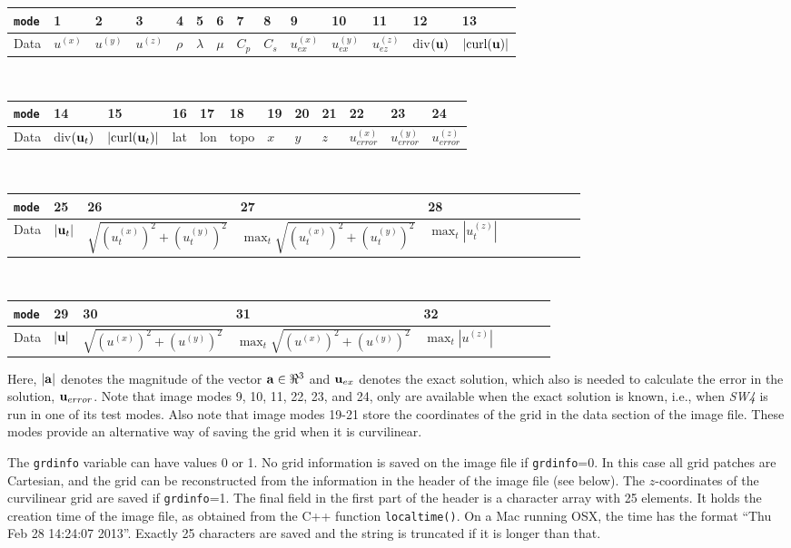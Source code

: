 \documentclass[11pt]{report}
\newcommand{\ub}{{\bf u}}
\begin{document}
\begin{flushleft}
\begin{tabular}{l||l|l|l|l|l|l|l|l|l|l|l|l|l}\hline
{\tt mode} & 1 & 2 & 3 & 4 & 5 & 6 & 7 & 8 & 9 & 10 & 11 & 12 & 13\\ \hline
Data & $u^{(x)}$ & $u^{(y)}$ & $u^{(z)}$ & $\rho$ & $\lambda$ & $\mu$ & $C_p$ & $C_s$ & $u_{ex}^{(x)}$
& $u_{ex}^{(y)}$ & $u_{ez}^{(z)}$ & div$(\ub)$ & $|\mbox{curl($\ub$)}|$ \\ \hline
\end{tabular}\\
\medskip
\begin{tabular}{l||l|l|l|l|l|l|l|l|l|l|l}\hline
{\tt mode}  & 14 & 15 & 16 & 17 & 18 & 19 & 20 & 21 & 22 & 23 & 24 \\ \hline\hline
Data & div$(\ub_t)$ & $|\mbox{curl($\ub_t$)}|$ & lat & lon &
topo & $x$ & $y$ & $z$ & $u_{error}^{(x)}$ & $u_{error}^{(y)}$ & $u_{error}^{(z)}$  \\ \hline
\end{tabular}\\
\medskip
\begin{tabular}{l||l|l|l|lllllll}\hline
{\tt mode} & 25 & 26 & 27 & 28 \\ \hline
Data & $|\ub_t|$ & $\sqrt{(u_t^{(x)})^2+(u_t^{(y)})^2}$ & $\max_t\sqrt{(u_t^{(x)})^2+(u_t^{(y)})^2}$
& $\max_t \left| u^{(z)}_t \right|$ 
\\ \hline
\end{tabular}\\
\medskip
\begin{tabular}{l||l|l|l|lllll}\hline
{\tt mode} & 29 & 30 & 31 & 32 \\ \hline
Data & $|\ub|$ & $\sqrt{(u^{(x)})^2+(u^{(y)})^2}$ & $\max_t\sqrt{(u^{(x)})^2+(u^{(y)})^2}$ & $\max_t
\left| u^{(z)} \right|$ \\ \hline 
\end{tabular}
\end{flushleft}
Here, $|{\bf a}|$ denotes the magnitude of the vector ${\bf a}\in\Re^3$ and $\ub_{ex}$ denotes the
exact solution, which also is needed to calculate the error in the solution, $\ub_{error}$. Note
that image modes 9, 10, 11, 22, 23, and 24, only are available when the exact solution is known,
i.e., when \emph{SW4} is run in one of its test modes. Also note that image modes 19-21 store the
coordinates of the grid in the data section of the image file. These modes provide an alternative
way of saving the grid when it is curvilinear.

The {\tt grdinfo} variable can have values 0 or 1. No grid information is saved on the image file if
{\tt grdinfo}=0. In this case all grid patches are Cartesian, and the grid can be reconstructed from
the information in the header of the image file (see below). The $z$-coordinates of the curvilinear
grid are saved if {\tt grdinfo}=1. The final field in the first part of the header is a character
array with 25 elements. It holds the creation time of the image file, as obtained from the C++
function {\tt localtime()}. On a Mac running OSX, the time has the format ``Thu Feb 28 14:24:07
2013''. Exactly 25 characters are saved and the string is truncated if it is longer than that.
\end{document}
